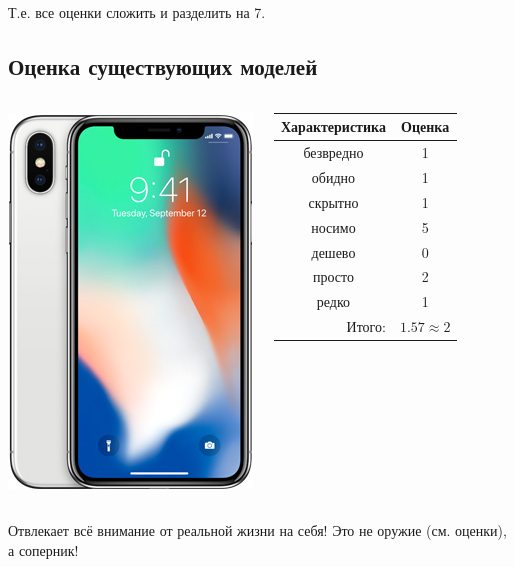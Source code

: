 Т.е. все оценки сложить и разделить на 7.

\subsection{Оценка существующих моделей}

\begin{frame}  %
    \begin{columns}
            \begin{center}
                \includegraphics[height=.8\textheight]{fig/iphoneX}
            \end{center}
            
            \begin{center}
                \begin{tabular}{c|c}
                    \hline\hline
                    Характеристика              & Оценка\\ \hline\hline
                    безвредно                   & 1 \\
                    обидно                      & 1 \\
                    скрытно                     & 1 \\
                    носимо                      & 5 \\
                    дешево                      & 0 \\
                    просто                      & 2 \\ 
                    редко                       & 1 \\ \hline
                    \multicolumn{1}{r|}{Итого:} & $1.57\approx 2$ \\
                \end{tabular}
            \end{center}
    \end{columns}    
    
    Отвлекает \alert{всё} внимание от \alert{реальной жизни} на себя! Это \alert{не оружие} (см. оценки), а \alert{соперник}!
\end{frame}

